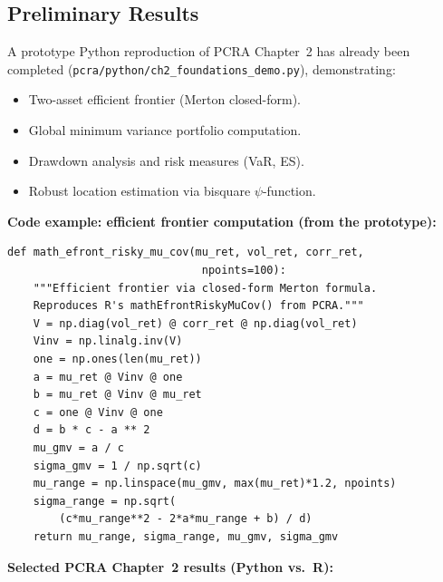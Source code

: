 \documentclass[11pt]{article}
\begin{document}
\subsection{Preliminary Results}

A prototype Python reproduction of PCRA Chapter~2 has already been
completed (\texttt{pcra/python/ch2\_foundations\_demo.py}), demonstrating:

\begin{itemize}[leftmargin=1.5em, itemsep=2pt]
  \item Two-asset efficient frontier (Merton closed-form).
  \item Global minimum variance portfolio computation.
  \item Drawdown analysis and risk measures (VaR, ES).
  \item Robust location estimation via bisquare $\psi$-function.
\end{itemize}

\noindent
\textbf{Code example: efficient frontier computation (from the prototype):}

\begin{lstlisting}[style=python, caption={PCRA Chapter 2: Merton efficient frontier in Python}]
def math_efront_risky_mu_cov(mu_ret, vol_ret, corr_ret,
                              npoints=100):
    """Efficient frontier via closed-form Merton formula.
    Reproduces R's mathEfrontRiskyMuCov() from PCRA."""
    V = np.diag(vol_ret) @ corr_ret @ np.diag(vol_ret)
    Vinv = np.linalg.inv(V)
    one = np.ones(len(mu_ret))
    a = mu_ret @ Vinv @ one
    b = mu_ret @ Vinv @ mu_ret
    c = one @ Vinv @ one
    d = b * c - a ** 2
    mu_gmv = a / c
    sigma_gmv = 1 / np.sqrt(c)
    mu_range = np.linspace(mu_gmv, max(mu_ret)*1.2, npoints)
    sigma_range = np.sqrt(
        (c*mu_range**2 - 2*a*mu_range + b) / d)
    return mu_range, sigma_range, mu_gmv, sigma_gmv
\end{lstlisting}



\noindent
\textbf{Selected PCRA Chapter~2 results (Python vs.\ R):}
\end{document}
